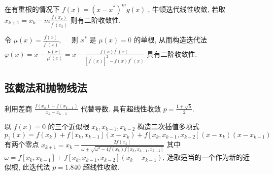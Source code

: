 \documentclass[10pt]{yerbaformat}
\begin{document}
\par 在有重根的情况下 $f(x)=\left(x-x^{*}\right)^{m} g(x)$ , 牛顿迭代线性收敛, 若取 $x_{k+1}=x_{k}-m \frac{f\left(x_{k}\right)}{f^{\prime}\left(x_{k}\right)}$ 则有二阶收敛性.

\par 令 $\mu(x)=\frac{f(x)}{f^{\prime}(x)}, \quad$ 则 $x^{*}$ 是 $\mu(x)=0$ 的单根, 从而构造迭代法 $\varphi(x)=x-\frac{\mu(x)}{\mu^{\prime}(x)}=x-\frac{f(x) f^{\prime}(x)}{\left[f^{\prime}(x)\right]^{2}-f(x) f^{\prime \prime}(x)}$ 具有二阶收敛性.

\subsection{弦截法和抛物线法}

\par 利用差商 $\frac{f\left(x_{k}\right)-f\left(x_{k-1}\right)}{x_{k}-x_{k-1}}$ 代替导数. 具有超线性收敛 $p=\frac{1+\sqrt{5}}{2}$.

\par 以 $f(x)=0$ 的三个近似根 $x_{k}, x_{k-1}, x_{k-2}$ 构造二次插值多项式 $$p_{1}(x)=f\left(x_{k}\right)+f\left[x_{k}, x_{k-1}\right]\left(x-x_{k}\right)+f\left[x_{k}, x_{k-1}, x_{k-2}\right]\left(x-x_{k}\right)\left(x-x_{k-1}\right)$$ 有两个零点 $x_{k+1}=x_{k}-\frac{2 f\left(x_{k}\right)}{\omega \pm \sqrt{\omega^{2}-4 f\left(x_{k}\right) f\left[x_{k}, x_{k-1}, x_{k-2}\right]}}$ 其中 $\omega=f\left[x_{k}, x_{k-1}\right]+f\left[x_{k}, x_{k-1}, x_{k-2}\right]\left(x_{k}-x_{k-1}\right)$, 选取适当的一个作为新的近似根, 此迭代法 $p=1.840$ 超线性收敛.
\end{document}

